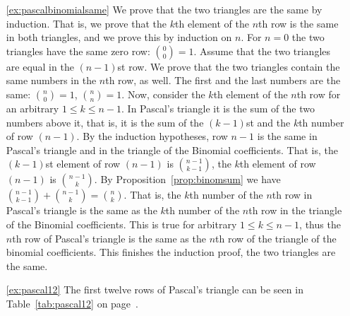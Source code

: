\begin{enumerate}
\item[\ref{ex:pascalbinomialsame}]
We prove that the two triangles are the same by induction. 
That is, we prove that the $k$th element of the $n$th row is the same in both triangles, 
and we prove this by induction on $n$. 
For $n=0$ the two triangles have the same zero row: $\binom{0}{0} = 1$. 
Assume that the two triangles are equal in the $(n-1)$st row. 
We prove that the two triangles contain the same numbers in the $n$th row, as well. 
The first and the last numbers are the same: $\binom{n}{0} = 1$, $\binom{n}{n} = 1$. 
Now, consider the $k$th element of the $n$th row for an arbitrary $1\leq k\leq n-1$. 
In Pascal's triangle it is the sum of the two numbers above it, 
that is, it is the sum of the $(k-1)$st and the $k$th number of row $(n-1)$. 
By the induction hypotheses, 
row $n-1$ is the same in Pascal's triangle and in the triangle of the Binomial coefficients. 
That is, the $(k-1)$st element of row $(n-1)$ is $\binom{n-1}{k-1}$, 
the $k$th element of row $(n-1)$ is $\binom{n-1}{k}$. 
By Proposition~\ref{prop:binomsum} we have $\binom{n-1}{k-1}+ \binom{n-1}{k} = \binom{n}{k}$. 
That is, the $k$th number of the $n$th row in Pascal's triangle is the same 
as the $k$th number of the $n$th row in the triangle of the Binomial coefficients. 
This is true for arbitrary $1\leq k\leq n-1$, 
thus the $n$th row of Pascal's triangle is the same as the $n$th row of the triangle of the binomial coefficients. 
This finishes the induction proof, 
the two triangles are the same. 

\item[\ref{ex:pascal12}]
The first twelve rows of Pascal's triangle can be seen in Table~\ref{tab:pascal12} on page~\pageref{tab:pascal12}. 


\end{enumerate}
